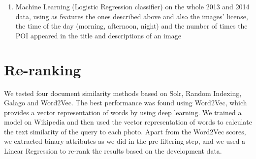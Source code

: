 \documentclass[a0,portrait]{a0poster}
\begin{document}
\begin{multicols}{2}
\begin{enumerate}
\item Machine Learning (Logistic Regression classifier) on the whole 2013 and 2014 data, using as features the ones described
above and also the images' license, the time of the day (morning, afternoon, night) and the number of times the
POI appeared in the title and descriptions of an image 
\end{enumerate}




\color{Navy} %
\section*{Re-ranking}
\color{DarkSlateGray} %

We tested four document similarity methods based on Solr, Random Indexing, Galago and Word2Vec.
The best performance was found using Word2Vec, which provides a vector representation of words by using deep learning.
We trained a model on Wikipedia and then used the vector representation of words to calculate the text similarity of the query to each photo.
Apart from the Word2Vec scores, we extracted binary attributes as we did in the pre-filtering
step, and we used a Linear Regression to re-rank the results based on the development data.




\end{multicols}
\end{document}
